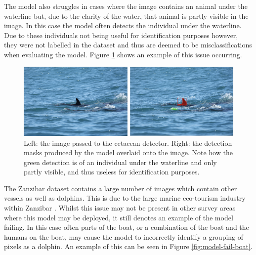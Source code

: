 The model also struggles in cases where the image contains an animal under the waterline but, due to the clarity of the water, that animal is partly visible in the image. In this case the model often detects the individual under the waterline. Due to these individuals not being useful for identification purposes however, they were not labelled in the dataset and thus are deemed to be misclassifications when evaluating the model. Figure \ref{fig:model-fail-underwater} shows an example of this issue occurring.

\begin{figure}[h]
	\begin{center}
		\includegraphics[scale=0.6]{Chapter3/figs/model-fail-underwater.png}
	\end{center}
	\caption[Left: the image passed to the cetacean detector. Right: the detection masks produced by the model overlaid onto the image.]{Left: the image passed to the cetacean detector. Right: the detection masks produced by the model overlaid onto the image. Note how the green detection is of an individual under the waterline and only partly visible, and thus useless for identification purposes. }
	\label{fig:model-fail-underwater}
\end{figure}

The Zanzibar dataset contains a large number of images which contain other vessels as well as dolphins. This is due to the large marine eco-tourism industry within Zanzibar \cite{sharpe_indian_2019, berggren_sustainable_2007}. Whilst this issue may not be present in other survey areas where this model may be deployed, it still denotes an example of the model failing. In this case often parts of the boat, or a combination of the boat and the humans on the boat, may cause the model to incorrectly identify a grouping of pixels as a dolphin. An example of this can be seen in Figure \ref{fig:model-fail-boat}.
 
